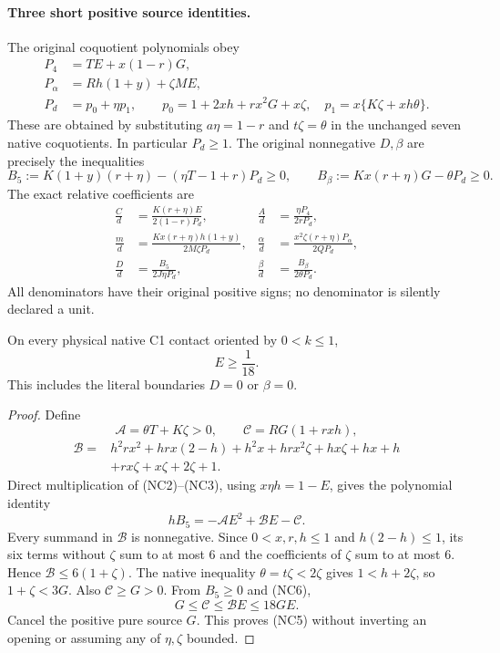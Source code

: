 \paragraph{Three short positive source identities.}
The original coquotient polynomials obey
\begin{align*}
 P_4&=TE+x(1-r)G,\\
 P_\alpha&=Rh(1+y)+\zeta ME,\\
 P_d&=p_0+\eta p_1,\qquad
 p_0=1+2xh+rx^2G+x\zeta,\quad
 p_1=x\{K\zeta+xh\theta\}.
 \tag{NC2}
\end{align*}
These are obtained by substituting $a\eta=1-r$ and $t\zeta=\theta$
in the unchanged seven native coquotients. In particular $P_d\ge1$.
The original nonnegative $D,\beta$ are precisely the inequalities
\[
 B_5:=K(1+y)(r+\eta)-(\eta T-1+r)P_d\ge0,
 \qquad B_\beta:=Kx(r+\eta)G-\theta P_d\ge0.
 \tag{NC3}
\]
The exact relative coefficients are
\begin{align*}
 \frac C d&=\frac{K(r+\eta)E}{2(1-r)P_d},&
 \frac A d&=\frac{\eta P_4}{2rP_d},\\
 \frac m d&=\frac{Kx(r+\eta)h(1+y)}{2M\zeta P_d},&
 \frac\alpha d&=\frac{x^2\zeta(r+\eta)P_\alpha}{2QP_d},\\
 \frac Dd&=\frac{B_5}{2J\eta P_d},&
 \frac\beta d&=\frac{B_\beta}{2\theta P_d}.
 \tag{NC4}
\end{align*}
All denominators have their original positive signs; no denominator is
silently declared a unit.

\begin{lemma}
On every physical native C1 contact oriented by $0<k\le1$,
\[
                         E\ge\frac1{18}.             \tag{NC5}
\]
This includes the literal boundaries $D=0$ or $\beta=0$.
\end{lemma}
\begin{proof}
Define
\[
 \mathcal A=\theta T+K\zeta>0,\qquad
 \mathcal C=RG(1+rxh),
\]
\begin{align*}
 \mathcal B={}&h^2rx^2+hrx(2-h)+h^2x+hrx^2\zeta
             +hx\zeta+hx+h\\
             &+rx\zeta+x\zeta+2\zeta+1.
\end{align*}
Direct multiplication of (NC2)--(NC3), using $x\eta h=1-E$,
gives the polynomial identity
\[
                  hB_5=-\mathcal A E^2+\mathcal B E-\mathcal C.
 \tag{NC6}
\]
Every summand in $\mathcal B$ is nonnegative. Since
$0<x,r,h\le1$ and $h(2-h)\le1$, its six terms without $\zeta$
sum to at most $6$ and the coefficients of $\zeta$ sum to at most
$6$. Hence $\mathcal B\le6(1+\zeta)$. The native inequality
$\theta=t\zeta<2\zeta$ gives $1<h+2\zeta$, so
$1+\zeta<3G$. Also $\mathcal C\ge G>0$. From $B_5\ge0$ and
(NC6),
\[
 G\le\mathcal C\le\mathcal B E\le18GE.
\]
Cancel the positive pure source $G$. This proves (NC5) without
inverting an opening or assuming any of $\eta,\zeta$ bounded.
\end{proof}

